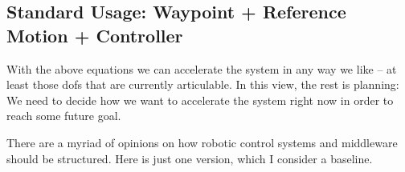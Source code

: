 

\subsection{Standard Usage: Waypoint + Reference Motion + Controller}


With the above equations we can accelerate the system in any way we
like -- at least those dofs that are currently articulable. In this
view, the rest is planning: We need to decide how we want to
accelerate the system right now in order to reach some future goal.

There are a myriad of opinions on how robotic control systems and middleware
should be structured. Here is just one version, which I consider a baseline.

